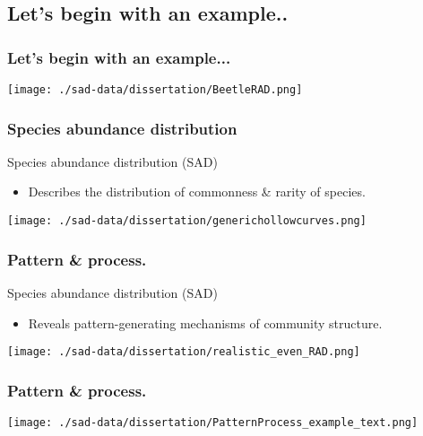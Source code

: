 \documentclass[14pt]{beamer}
\begin{document}
\subsection{Let's begin with an example..}
\begin{frame}
\frametitle{Let's begin with an example...}
\begin{center}
\texttt{[image: ./sad-data/dissertation/BeetleRAD.png]}\\
\end{center}
\end{frame}

\begin{frame}
\frametitle{Species abundance distribution}
Species abundance distribution (SAD)
\begin{itemize}
\item Describes the distribution of commonness \& rarity of species.
\end{itemize}
\begin{center}
\texttt{[image: ./sad-data/dissertation/generichollowcurves.png]}\\
\end{center}
\end{frame}

\begin{frame}
\frametitle{Pattern \& process.}
Species abundance distribution (SAD)
\begin{itemize}
\item Reveals pattern-generating mechanisms of community structure.
\end{itemize}
\begin{center}
\texttt{[image: ./sad-data/dissertation/realistic\_even\_RAD.png]}\\
\end{center}
\end{frame}

\begin{frame}
\frametitle{Pattern \& process.}
\begin{center}
\texttt{[image: ./sad-data/dissertation/PatternProcess\_example\_text.png]}\\
\end{center}
\end{frame}
\end{document}
